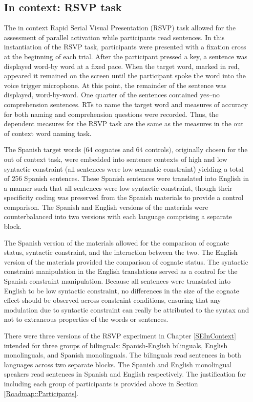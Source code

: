 \subsection{In context: RSVP task}\label{Roadmap::WordNaming::InContext}
The in context Rapid Serial Visual Presentation (RSVP) task allowed for the assessment of parallel activation while participants read sentences. In this instantiation of the RSVP task, participants were presented with a fixation cross at the beginning of each trial. After the participant pressed a key, a sentence was displayed word-by word at a fixed pace. When the target word, marked in red, appeared it remained on the screen until the participant spoke the word into the voice trigger microphone. At this point, the remainder of the sentence was displayed, word-by-word. One quarter of the sentences contained yes--no comprehension sentences. RTs to name the target word and measures of accuracy for both naming and comprehension questions were recorded. Thus, the dependent measures for the RSVP task are the same as the measures in the out of context word naming task.

The Spanish target words (64 cognates and 64 controls), originally chosen for  the out of context task, were embedded into sentence contexts of high and low syntactic constraint (all sentences were low semantic constraint) yielding a total of 256 Spanish sentences. These Spanish sentences were translated into English in a manner such that all sentences were low syntactic constraint, though their specificity coding was preserved from the Spanish materials to provide a control comparison. The Spanish and English versions of the materials were counterbalanced into two versions with each language comprising a separate block. 

The Spanish version of the materials allowed for the comparison of cognate status, syntactic constraint, and the interaction between the two. The English version of the materials provided the comparison of cognate status. The syntactic constraint manipulation in the English translations served as a control for the Spanish constraint manipulation. Because all sentences were translated into English to be low syntactic constraint, no differences in the size of the cognate effect should be observed across constraint conditions, ensuring that any modulation due to syntactic constraint can really be attributed to the syntax and not to extraneous properties of the words or sentences.

There were three versions of the RSVP experiment in Chapter \ref{SEInContext} intended for three groups of bilinguals: Spanish-English bilinguals, English monolinguals, and Spanish monolinguals. The bilinguals read sentences in both languages across two separate blocks. The Spanish and English monolingual speakers read sentences in Spanish and English respectively. The justification for including each group of participants is provided above in Section \ref{Roadmap::Participants}.

